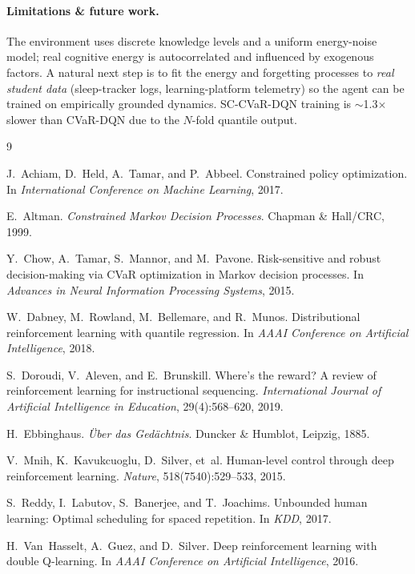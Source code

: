 \documentclass[a4paper,11pt]{article}
\theoremstyle{definition}
\begin{document}
\paragraph{Limitations \& future work.} The environment uses discrete knowledge levels and a uniform energy-noise model; real cognitive energy is autocorrelated and influenced by exogenous factors. A natural next step is to fit the energy and forgetting processes to \emph{real student data} (sleep-tracker logs, learning-platform telemetry) so the agent can be trained on empirically grounded dynamics. SC-CVaR-DQN training is $\sim$1.3$\times$ slower than CVaR-DQN due to the $N$-fold quantile output.

\clearpage

\renewcommand{\refname}{References}

\begin{thebibliography}{9}

J.~Achiam, D.~Held, A.~Tamar, and P.~Abbeel.
\newblock Constrained policy optimization.
\newblock In \emph{International Conference on Machine Learning}, 2017.

E.~Altman.
\newblock \emph{Constrained Markov Decision Processes}.
\newblock Chapman \& Hall/CRC, 1999.

Y.~Chow, A.~Tamar, S.~Mannor, and M.~Pavone.
\newblock Risk-sensitive and robust decision-making via CVaR optimization in Markov decision processes.
\newblock In \emph{Advances in Neural Information Processing Systems}, 2015.

W.~Dabney, M.~Rowland, M.~Bellemare, and R.~Munos.
\newblock Distributional reinforcement learning with quantile regression.
\newblock In \emph{AAAI Conference on Artificial Intelligence}, 2018.

S.~Doroudi, V.~Aleven, and E.~Brunskill.
\newblock Where's the reward? A review of reinforcement learning for instructional sequencing.
\newblock \emph{International Journal of Artificial Intelligence in Education}, 29(4):568--620, 2019.

H.~Ebbinghaus.
\newblock \emph{{\"U}ber das Ged{\"a}chtnis}.
\newblock Duncker \& Humblot, Leipzig, 1885.

V.~Mnih, K.~Kavukcuoglu, D.~Silver, et~al.
\newblock Human-level control through deep reinforcement learning.
\newblock \emph{Nature}, 518(7540):529--533, 2015.

S.~Reddy, I.~Labutov, S.~Banerjee, and T.~Joachims.
\newblock Unbounded human learning: Optimal scheduling for spaced repetition.
\newblock In \emph{KDD}, 2017.

H.~Van~Hasselt, A.~Guez, and D.~Silver.
\newblock Deep reinforcement learning with double Q-learning.
\newblock In \emph{AAAI Conference on Artificial Intelligence}, 2016.

\end{thebibliography}
\end{document}
